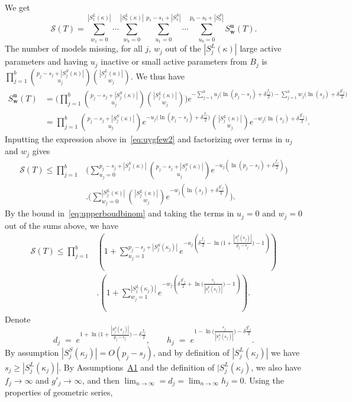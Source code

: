 \documentclass[
  12pt]{article}
\newcommand{\bu}{\mathbf{u}}
\newcommand{\bw}{\mathbf{w}}
\begin{document}
We get
\begin{equation}\label{eq:uygfew2}
    \mathcal{S}(T)=\sum_{w_1=0}^{|S^L_1(\kappa)|}\cdots\sum_{w_b=0}^{|S^L_b(\kappa)|}\sum_{u_1=0}^{p_1-s_1+|S_1^S|}\cdots\sum_{u_b=0}^{p_b-s_b+|S_b^S|}S^{\bu}_{\bw}(T).
\end{equation}
The number of models missing, for all $j$, $w_j$ out of the $|S^L_j(\kappa)|$ large active parameters and having $u_j$ inactive or small active parameters from $B_j$ is $\prod_{j=1}^b {\binom{p_j-s_j+|S^S_j(\kappa)|}{u_j}}{\binom{|S^L_j(\kappa)|}{w_j}}$. We thus have
\begin{align*}
    S^{\bu}_{\bw}(T)&= \bigg(\prod_{j=1}^b {\binom{p_j-s_j+|S^S_j(\kappa)|}{u_j}}{\binom{|S^L_j(\kappa)|}{w_j}}\bigg)e^{- \sum_{j=1}^b u_j\big(\ln(p_j-s_j)+\delta \tfrac{f_j}{2}\big)-\sum_{j=1}^b w_j\big(\ln(s_j)+\delta \tfrac{g'_j}{2}\big)} \\
    &= \prod_{j=1}^b {\binom{p_j-s_j+|S^S_j(\kappa)|}{u_j}}e^{- u_j\big(\ln(p_j-s_j)+\delta \tfrac{f_j}{2}\big)}{\binom{|S^L_j(\kappa)|}{w_j}}e^{-w_j\big(\ln(s_j)+\delta \tfrac{g'_j}{2}\big)}.
\end{align*}
Inputting the expression above in~\eqref{eq:uygfew2} and factorizing over terms in $u_j$ and $w_j$ gives
\begin{align*}
    \mathcal{S}(T)\leq\prod_{j=1}^b & \Bigg(\sum_{u_j=0}^{p_j-s_j+|S^S_j(\kappa)|}{\binom{p_j-s_j+|S^S_j(\kappa)|}{u_j}}e^{- u_j(\ln(p_j-s_j)+\delta \tfrac{f_j}{2})}\Bigg)\\&.\Bigg(
    \sum_{w_j=0}^{|S^L_j(\kappa)|}{\binom{|S^L_j(\kappa)|}{w_j}}
    e^{-w_j(\ln(s_j)+\delta \tfrac{g'_j}{2})}\Bigg).
\end{align*}
By the bound in~\eqref{eq:upperboudbinom} and taking the terms in $u_j=0$ and $w_j=0$ out of the sums above, 
we have
\begin{align}\label{eq:ogr}
    \mathcal{S}(T)\leq\prod_{j=1}^b & \left(1+\sum_{u_j=1}^{p_j-s_j+|S_j^{S}(\kappa_j)|}e^{-u_j\left(\delta \tfrac{f_j}{2}-\ln\big(1+\frac{|S_j^{S}(\kappa_j)|}{p_j-s_j}\big)-1\right)}\right)\\&.\left(1+
    \sum_{w_j=1}^{|S_j^{L}(\kappa_j)|}    e^{-w_j\left(\delta \tfrac{g'_j}{2}+\ln\big(\frac{s_j}{|S_j^{L}(\kappa_j)|}\big)-1\right)}\right).\nonumber
\end{align}
Denote
$$
d_j\;=\;e^{1+\ln\big(1+\frac{|S_j^{S}(\kappa_j)|}{p_j-s_j}\big)-\delta \tfrac{f_j}{2}},\qquad h_j\;=\;e^{1-\ln\big(\frac{s_j}{|S_j^{L}(\kappa_j)|}\big)-\delta \tfrac{g'_j}{2}}.
$$
By assumption $|S_j^{S}(\kappa_j)|=O(p_j-s_j)$, and by definition of $|S_j^{L}(\kappa_j)|$ we have $s_j\geq|S_j^{L}(\kappa_j)|$. By Assumptions~\hyperlink{lab:A1}{A1} and the definition of $|S_j^{L}(\kappa_j)$, we also have $f_j\to\infty$ and $g'_j\to\infty$, and then $\lim_{n \to \infty}= d_j= \lim_{n \to \infty} h_j=0$. Using the properties of geometric series, 
\end{document}
